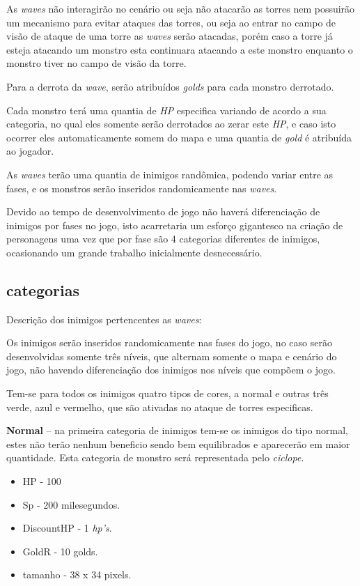 \documentclass[11pt]{article} %
\begin{document}
As \textit{waves} não interagirão no cenário ou seja não atacarão as torres nem possuirão um mecanismo para evitar ataques das torres, ou seja ao entrar no campo de visão de ataque de uma torre as \textit{waves} serão atacadas, porém caso a torre já esteja atacando um monstro esta continuara atacando a este monstro enquanto o monstro tiver no campo de visão da torre.

Para a derrota da \textit{wave}, serão atribuídos \textit{golds} para cada monstro derrotado. 

Cada monstro terá uma quantia de \textit{HP} especifica variando de acordo a sua categoria, no qual eles somente serão derrotados ao zerar este \textit{HP}, e caso isto ocorrer eles automaticamente somem do mapa e uma quantia de \textit{gold} é atribuída ao jogador.

As \textit{waves} terão uma quantia de inimigos randômica, podendo variar entre as fases, e os monstros serão inseridos randomicamente nas \textit{waves}.

Devido ao tempo de desenvolvimento de jogo não haverá diferenciação de inimigos por fases no jogo, isto acarretaria um esforço gigantesco na criação de personagens uma vez que por fase são 4 categorias diferentes de inimigos, ocasionando um grande trabalho inicialmente desnecessário. 

\subsection{categorias}
Descrição dos inimigos pertencentes as \textit{waves}:

Os inimigos serão inseridos randomicamente nas fases do jogo, no caso serão desenvolvidas somente três níveis, que alternam somente o mapa e cenário do jogo, não havendo diferenciação dos inimigos nos níveis que compõem o jogo.

Tem-se para todos os inimigos quatro tipos de cores, a normal e outras três verde, azul e vermelho, que são ativadas no ataque de torres especificas. 

\textbf{{\large Normal}} – na primeira categoria de inimigos tem-se os inimigos do tipo normal, estes não terão nenhum beneficio sendo bem equilibrados e aparecerão em maior quantidade. Esta categoria de monstro será representada pelo \textit{ciclope}.
\begin{itemize}
\item HP - 100
\item Sp - 200 milesegundos.
\item DiscountHP - 1 \textit{hp's}.
\item GoldR - 10 golds.
\item tamanho - 38 x 34 pixels.
\end{itemize}
\end{document}
